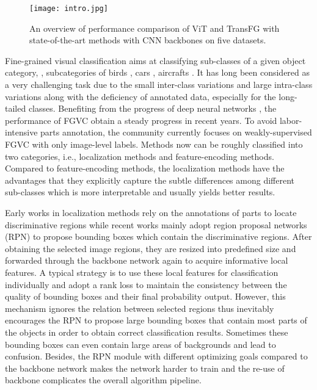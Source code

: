 \documentclass[10pt,twocolumn,letterpaper]{article}
\begin{document}
\begin{figure}
    \centering
    \texttt{[image: intro.jpg]}
    \caption{An overview of performance comparison of ViT and TransFG with state-of-the-art methods with CNN backbones on five datasets.}
    \label{fig:intro}
    \vspace{-4mm}
\end{figure}

Fine-grained visual classification aims at classifying sub-classes of a given object category, \eg, subcategories of birds \cite{WahCUB_200_2011, van2015building}, cars \cite{KrauseStarkDengFei-Fei_3DRR2013}, aircrafts \cite{maji13fine-grained}. It has long been considered as a very challenging task due to the small inter-class variations and large intra-class variations along with the deficiency of annotated data, especially for the long-tailed classes. Benefiting from the progress of deep neural networks \cite{NIPS2012_c399862d, simonyan2015deep, he2015deep}, the performance of FGVC obtain a steady progress in recent years. To avoid labor-intensive parts annotation, the community currently focuses on weakly-supervised FGVC with only image-level labels. Methods now can be roughly classified into two categories, i.e., localization methods and feature-encoding methods. Compared to feature-encoding methods, the localization methods have the advantages that they explicitly capture the subtle differences among different sub-classes which is more interpretable and usually yields better results.

Early works in localization methods rely on the annotations of parts to locate discriminative regions while recent works \cite{ge2019weakly, liu2020filtration, ding2019selective, zheng2019looking, yang2018learning} mainly adopt region proposal networks (RPN) to propose bounding boxes which contain the discriminative regions. After obtaining the selected image regions, they are resized into predefined size and forwarded through the backbone network again to acquire informative local features. A typical strategy is to use these local features for classification individually and adopt a rank loss \cite{chen2009ranking} to maintain the consistency between the quality of bounding boxes and their final probability output. However, this mechanism ignores the relation between selected regions thus inevitably encourages the RPN to propose large bounding boxes that contain most parts of the objects in order to obtain correct classification results. Sometimes these bounding boxes can even contain large areas of backgrounds and lead to confusion. Besides, the RPN module with different optimizing goals compared to the backbone network makes the network harder to train and the re-use of backbone complicates the overall algorithm pipeline.
\end{document}
